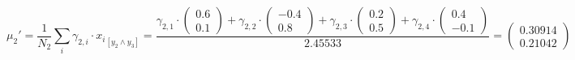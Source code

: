 \documentclass[12pt]{article}
\begin{document}
\begin{enumerate}[leftmargin=\labelsep]
        \begingroup
        \allowdisplaybreaks
        \begin{equation*}
          \mu_2' = \frac{1}{N_2} \sum_{i} \gamma_{2,i} \cdot {x_i}_{[y_2 \land y_3]}
          = \frac{\gamma_{2,1} \cdot \begin{pmatrix} 0.6 \\ 0.1 \end{pmatrix}
            + \gamma_{2,2} \cdot \begin{pmatrix} -0.4 \\ 0.8 \end{pmatrix}
            + \gamma_{2,3} \cdot \begin{pmatrix} 0.2 \\ 0.5 \end{pmatrix}
            + \gamma_{2,4} \cdot \begin{pmatrix} 0.4 \\ -0.1 \end{pmatrix}}{2.45533}
          = \begin{pmatrix} 0.30914 \\ 0.21042 \end{pmatrix}
        \end{equation*}
        \endgroup


\end{enumerate}
\end{document}
